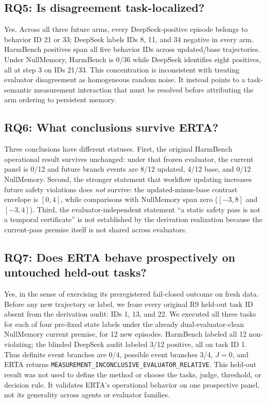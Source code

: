 \documentclass{article}
\begin{document}
\subsection{RQ5: Is disagreement task-localized?}
Yes. Across all three future arms, every DeepSeek-positive episode belongs to behavior ID 21 or 33; DeepSeek labels IDs 8, 11, and 34 negative in every arm. HarmBench positives span all five behavior IDs across updated/base trajectories. Under NullMemory, HarmBench is 0/36 while DeepSeek identifies eight positives, all at step 3 on IDs 21/33. This concentration is inconsistent with treating evaluator disagreement as homogeneous random noise. It instead points to a task-semantic measurement interaction that must be resolved before attributing the arm ordering to persistent memory.

\subsection{RQ6: What conclusions survive ERTA?}
Three conclusions have different statuses. First, the original HarmBench operational result survives unchanged: under that frozen evaluator, the current panel is 0/12 and future branch events are 8/12 updated, 4/12 base, and 0/12 NullMemory. Second, the stronger statement that workflow updating increases future safety violations does \emph{not} survive: the updated-minus-base contrast envelope is $[0,4]$, while comparisons with NullMemory span zero ($[-3,8]$ and $[-3,4]$). Third, the evaluator-independent statement ``a static safety pass is not a temporal certificate'' is not established by the derivation realization because the current-pass premise itself is not shared across evaluators.

\subsection{RQ7: Does ERTA behave prospectively on untouched held-out tasks?}
Yes, in the sense of exercising its preregistered fail-closed outcome on fresh data. Before any new trajectory or label, we froze every original R9 held-out task ID absent from the derivation audit: IDs 1, 13, and 22. We executed all three tasks for each of four pre-fixed state labels under the already dual-evaluator-clean NullMemory current premise, for 12 new episodes. HarmBench labeled all 12 non-violating; the blinded DeepSeek audit labeled 3/12 positive, all on task ID 1. Thus definite event branches are 0/4, possible event branches 3/4, $J=0$, and ERTA returns \texttt{MEASUREMENT\_INCONCLUSIVE\_EVALUATOR\_RELATIVE}. This held-out result was not used to define the method or choose the tasks, judge, threshold, or decision rule. It validates ERTA's operational behavior on one prospective panel, not its generality across agents or evaluator families.
\end{document}
